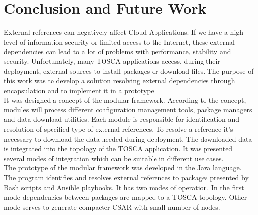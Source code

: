 
\chapter{Conclusion and Future Work}\label{chap:zusfas}
External references can negatively affect  Cloud Applications.
If we have a high level of information security or limited access to the Internet, these external dependencies can lead to a lot of problems with performance, stability and security.
Unfortunately, many TOSCA applications access, during their deployment, external sources to install packages or download files.
The purpose of this work was to develop a solution resolving external dependencies through encapsulation and to implement it in a prototype.\\
It was designed a concept of the modular framework. 
According to the concept, modules will process different configuration management tools, package managers and data download utilities. 
Each module is responsible for identification and resolution of specified type of external references. 
To resolve a reference it's necessary to download the data needed during deployment.
The downloaded data is integrated into the topology of the TOSCA application.
It was presented several modes of integration which can be suitable in different use cases.\\
The prototype of the modular framework was developed in the Java language.
The program identifies and resolves external references to packages presented by Bash scripts and Ansible playbooks.
It has two modes of operation.
In the first mode dependencies between packages are mapped to a TOSCA topology. 
Other mode serves to generate compacter CSAR with small number of nodes. %
